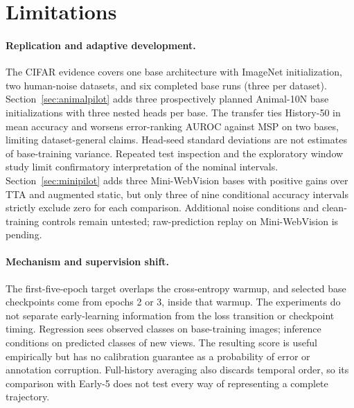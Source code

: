 \section{Limitations}
\paragraph{Replication and adaptive development.}
The CIFAR evidence covers one base architecture with ImageNet initialization, two human-noise datasets, and six completed base runs (three per dataset). Section~\ref{sec:animalpilot} adds three prospectively planned Animal-10N base initializations with three nested heads per base. The transfer ties History-50 in mean accuracy and worsens error-ranking AUROC against MSP on two bases, limiting dataset-general claims. Head-seed standard deviations are not estimates of base-training variance. Repeated test inspection and the exploratory window study limit confirmatory interpretation of the nominal intervals. Section~\ref{sec:minipilot} adds three Mini-WebVision bases with positive gains over TTA and augmented static, but only three of nine conditional accuracy intervals strictly exclude zero for each comparison. Additional noise conditions and clean-training controls remain untested; raw-prediction replay on Mini-WebVision is pending.

\paragraph{Mechanism and supervision shift.}
The first-five-epoch target overlaps the cross-entropy warmup, and selected base checkpoints come from epochs 2 or 3, inside that warmup. The experiments do not separate early-learning information from the loss transition or checkpoint timing. Regression sees observed classes on base-training images; inference conditions on predicted classes of new views. The resulting score is useful empirically but has no calibration guarantee as a probability of error or annotation corruption. Full-history averaging also discards temporal order, so its comparison with Early-5 does not test every way of representing a complete trajectory.

